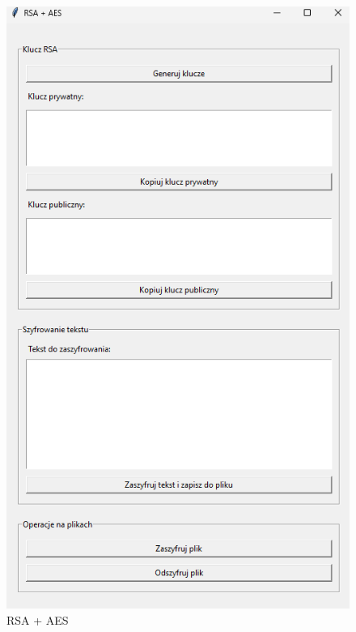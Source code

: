 \documentclass[12pt,a4paper]{article}
\begin{document}
\begin{figure}[!htb]
\begin{center}
\includegraphics[scale=0.45]{pictures/rsaaes.png}
\caption{RSA + AES}
\label{fig:RSA + AES}
\end{center}
\end{figure}

\newpage
\end{document}

